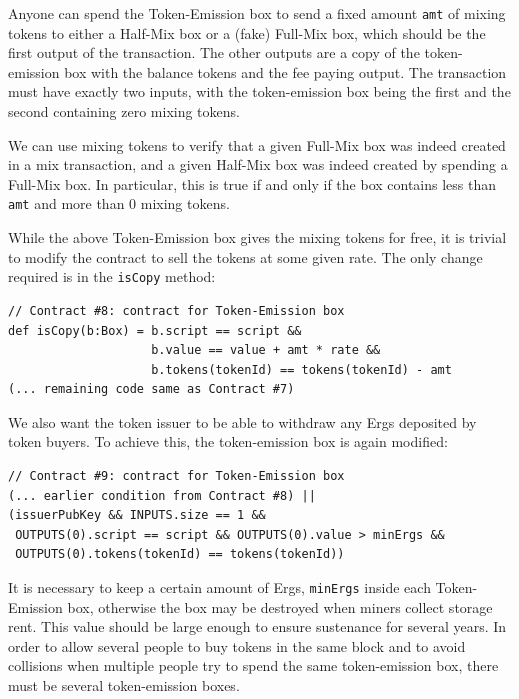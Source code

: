 \documentclass[runningheads]{llncs}
\begin{document}
Anyone can spend the Token-Emission box to send a fixed amount \texttt{amt} of mixing tokens to either a Half-Mix box or a (fake) Full-Mix box, which should be the first output of the transaction. The other outputs are a copy of the token-emission box with the balance tokens and the fee paying output. The transaction must have exactly two inputs, with the token-emission box being the first and the second containing zero mixing tokens. 

We can use mixing tokens to verify that a given Full-Mix box was indeed created in a mix transaction, and a given Half-Mix box was indeed created by spending a Full-Mix box. In particular, this is true if and only if the box contains less than \texttt{amt} and more than 0 mixing tokens.  

While the above Token-Emission box gives the mixing tokens for free, it is trivial to modify the contract to sell the tokens at some given rate. The only change required is in the \texttt{isCopy} method:

{\small
\begin{Verbatim}[frame=single]
// Contract #8: contract for Token-Emission box
def isCopy(b:Box) = b.script == script && 
                    b.value == value + amt * rate &&
                    b.tokens(tokenId) == tokens(tokenId) - amt
(... remaining code same as Contract #7)
\end{Verbatim}
}

We also want the token issuer to be able to withdraw any Ergs deposited by token buyers. To achieve this, the token-emission box is again modified:

{\small
\begin{Verbatim}[frame=single]
// Contract #9: contract for Token-Emission box
(... earlier condition from Contract #8) || 
(issuerPubKey && INPUTS.size == 1 && 
 OUTPUTS(0).script == script && OUTPUTS(0).value > minErgs &&
 OUTPUTS(0).tokens(tokenId) == tokens(tokenId))
\end{Verbatim}
}
It is necessary to keep a certain amount of Ergs, \texttt{minErgs} inside each Token-Emission box, otherwise the box may be destroyed when miners collect storage rent. This value should be large enough to ensure sustenance for several years. 
In order to allow several people to buy tokens in the same block and to avoid collisions when multiple people try to spend the same token-emission box, there must be several token-emission boxes. 
\end{document}
